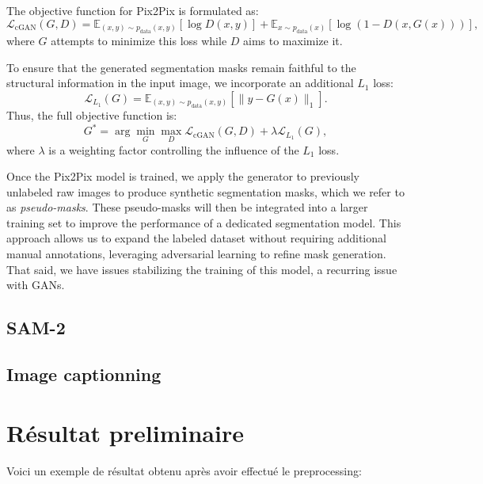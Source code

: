 \documentclass[]{article}
\begin{document}
The objective function for Pix2Pix is formulated as:
\begin{equation}
    \mathcal{L}_{\text{cGAN}}(G, D) = \mathbb{E}_{(x,y) \sim p_{\text{data}}(x,y)} \left[ \log D(x, y) \right] + \mathbb{E}_{x \sim p_{\text{data}}(x)} \left[ \log (1 - D(x, G(x))) \right],
\end{equation}
where \( G \) attempts to minimize this loss while \( D \) aims to maximize it.

To ensure that the generated segmentation masks remain faithful to the structural information in the input image, we incorporate an additional \( L_1 \) loss:
\begin{equation}
    \mathcal{L}_{L_1}(G) = \mathbb{E}_{(x,y) \sim p_{\text{data}}(x,y)} \left[ \| y - G(x) \|_1 \right].
\end{equation}
Thus, the full objective function is:
\begin{equation}
    G^* = \arg \min_G \max_D \mathcal{L}_{\text{cGAN}}(G, D) + \lambda \mathcal{L}_{L_1}(G),
\end{equation}
where \( \lambda \) is a weighting factor controlling the influence of the \( L_1 \) loss.

Once the Pix2Pix model is trained, we apply the generator to previously unlabeled raw images to produce synthetic segmentation masks, which we refer to as \textit{pseudo-masks}. These pseudo-masks will then be integrated into a larger training set to improve the performance of a dedicated segmentation model. This approach allows us to expand the labeled dataset without requiring additional manual annotations, leveraging adversarial learning to refine mask generation. That said, we have issues stabilizing the training of this model, a recurring issue with GANs. 

\subsection{SAM-2}



\subsection{Image captionning}



\section{Résultat preliminaire}
Voici un exemple de résultat obtenu après avoir effectué le preprocessing:
\end{document}
